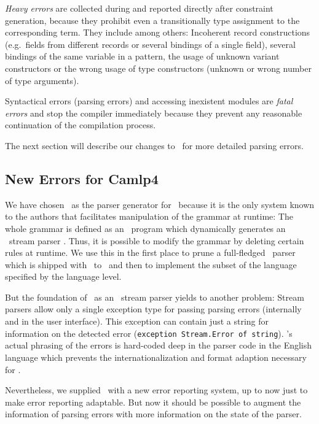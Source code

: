 \emph{Heavy errors} are collected during and reported directly after constraint
generation, because they prohibit even a transitionally type assignment 
to the corresponding term. They include among others:
Incoherent record constructions (e.g.\ fields from different records or several
bindings of a single field), several bindings of the same variable in a pattern,
the usage of unknown variant constructors or the wrong usage of type
constructors (unknown or wrong number of type arguments).

Syntactical errors (parsing errors) and accessing inexistent modules are
\emph{fatal errors} and stop the compiler immediately because they prevent
any reasonable continuation of the compilation process.

The next section will describe our changes to \camlpf\ for more detailed
parsing errors.

\subsection{New Errors for Camlp4}

We have chosen \camlpf\ as the parser generator for \easyocaml\ because it is
the only system known to the authors that facilitates manipulation of the
grammar at runtime: The whole grammar is defined as an \ocaml\ program which
dynamically generates an \ocaml\ stream parser \citep{ocamlstreamparser}. Thus,
it is possible to modify the grammar by deleting certain rules at runtime. We
use this in the first place to prune a full-fledged \ocaml\ parser which is
shipped with \camlpf\ to \camlm\ and then to implement the subset of the
language specified by the language level.

But the foundation of \camlpf\ as an \ocaml\ stream parser yields to another
problem: Stream parsers allow only a single exception type for passing parsing
errors (internally and in the user interface). This exception can contain
just a string for information on the detected error (\texttt{exception
Stream.Error of string}). \camlpf's actual phrasing of the errors is hard-coded
deep in the parser code in the English language which prevents the
internationalization and format adaption necessary for \easyocaml.


Nevertheless, we supplied \camlpf\ with a new error reporting system, up 
to now just to make error reporting adaptable. But now it should be possible to
augment the information of parsing errors with more information on the state of
the parser.

